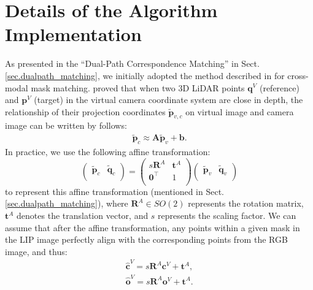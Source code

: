 \clearpage
\setcounter{page}{1}
\newcommand{\clref}{\textcolor{cvprblue}}

\maketitlesupplementary

\section{Details of the Algorithm Implementation}
\label{sec.sup_algo_detail}
As presented in the ``Dual-Path Correspondence Matching'' in Sect. \ref{sec.dualpath_matching}, we initially adopted the method described in \cite{zhiwei2024lcec} for cross-modal mask matching. \cite{zhiwei2024lcec} proved that when two 3D LiDAR points $\boldsymbol{q}^V$ (reference) and $\boldsymbol{p}^V$ (target) in the virtual camera coordinate system are close in depth, the relationship of their projection coordinates $\tilde{\boldsymbol{p}}_{v,c}$ on virtual image and camera image can be written by follows:
\begin{align}
\tilde{\boldsymbol{p}}_c \approx 
\boldsymbol{A}
\tilde{\boldsymbol{p}}_v + 
\boldsymbol{b}.
\label{eq.LscLaw}
\end{align}
In practice, we use the following affine transformation:
\begin{equation}
\begin{pmatrix}
\tilde{\boldsymbol{p}}_c & \tilde{\boldsymbol{q}}_c \\
\end{pmatrix}
=
\begin{pmatrix}
s{\boldsymbol{R}}^A & \boldsymbol{t}^A \\
\boldsymbol{0}^\top &1 \\
\end{pmatrix}
\begin{pmatrix}
\tilde{\boldsymbol{p}}_v & \tilde{\boldsymbol{q}}_v \\
\end{pmatrix}
\label{eq.LscLaw_final}
\end{equation}
to represent this affine transformation (mentioned in Sect. \ref{sec.dualpath_matching}), where $\boldsymbol{R}^A\in{SO(2)}$ represents the rotation matrix, $\boldsymbol{t}^A$ denotes the translation vector, and $s$ represents the scaling factor. We can assume that after the affine transformation, any points within a given mask in the LIP image perfectly align with the corresponding points from the RGB image, and thus:
\begin{equation}
\begin{aligned}
\hat{\boldsymbol{c}}^V = s\boldsymbol{R}^A \boldsymbol{c}^V + \boldsymbol{t}^A, \\
\hat{\boldsymbol{o}}^V = s\boldsymbol{R}^A \boldsymbol{o}^V + \boldsymbol{t}^A. 
\end{aligned}
\label{eq.correction}
\end{equation}
